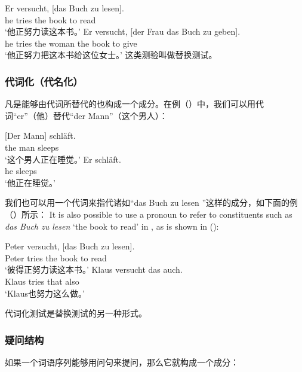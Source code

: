 \eal
\ex\label{ex-das-buch-zu-lesen} 
\gll Er versucht, [das Buch zu lesen].\\
	 he tries \spacebr{}the book to read\\
\glt `他正努力读这本书。'
\ex 
\gll Er versucht, [der Frau das Buch zu geben].\\
	 he tries \spacebr{}the woman the book to give\\
\glt `他正努力把这本书给这位女士。'
\zl
%
这类测验叫做替换测试。


\subsubsection{代词化（代名化）}
凡是能够由代词所替代的也构成一个成分。在例（）中，我们可以用代词“er”（他）替代“der Mann”（这个男人）：

\eal
\ex 
\gll {}[Der Mann] schläft.\\
	 {}\spacebr{}the man sleeps\\
\glt `这个男人正在睡觉。'
\ex 
\gll Er schläft.\\
	 he sleeps\\
\glt `他正在睡觉。'
\zl

\noindent
我们也可以用一个代词来指代诸如“das Buch zu lesen ”这样的成分，如下面的例（）所示：
It is also possible to use a pronoun to refer to constituents such as \emph{das Buch zu lesen} `the
book to read' in , as is shown in ():

\eal
\ex 
\gll Peter versucht, [das Buch zu lesen].\\
	 Peter tries \spacebr{}the book to read\\
\glt `彼得正努力读这本书。'
\ex 
\gll Klaus versucht das auch.\\
	 Klaus tries that also\\
\glt `Klaus也努力这么做。'
\zl

\noindent
代词化测试是替换测试的另一种形式。

\subsubsection{疑问结构}
如果一个词语序列能够用问句来提问，那么它就构成一个成分：

